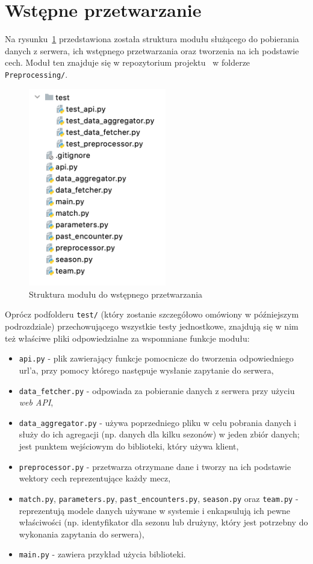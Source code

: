     \section{Wstępne przetwarzanie}
    \noindent Na rysunku~\ref{fig:preprocessing_structure} przedstawiona została struktura modułu służącego do pobierania danych z serwera, ich wstępnego przetwarzania oraz tworzenia na ich podstawie cech. Moduł ten znajduje się w repozytorium projektu~\cite{repo} w folderze \texttt{Preprocessing/}.
    \begin{figure}[H] 
        \centering\includegraphics[width=6cm]{figures/preprocessing_structure.png}
        \caption{Struktura modułu do wstępnego przetwarzania}
        \label{fig:preprocessing_structure}
    \end{figure}
    
    Oprócz podfolderu \texttt{test/} (który zostanie szczegółowo omówiony w późniejszym podrozdziale) przechowującego wszystkie testy jednostkowe, znajdują się w nim też właściwe pliki odpowiedzialne za wspomniane funkcje modułu:
    
    \begin{itemize}
        \item \texttt{api.py} - plik zawierający funkcje pomocnicze do tworzenia odpowiedniego url'a, przy pomocy którego następuje wysłanie zapytanie do serwera,
        \item \texttt{data\_fetcher.py} - odpowiada za pobieranie danych z serwera przy użyciu \emph{web API},
        \item \texttt{data\_aggregator.py} - używa poprzedniego pliku w celu pobrania danych i służy do ich agregacji (np. danych dla kilku sezonów) w jeden zbiór danych; jest punktem wejściowym do biblioteki, który używa klient,
        \item \texttt{preprocessor.py} - przetwarza otrzymane dane i tworzy na ich podstawie wektory cech reprezentujące każdy mecz,
        \item \texttt{match.py}, \texttt{parameters.py}, \texttt{past\_encounters.py}, \texttt{season.py} oraz \texttt{team.py} - reprezentują modele danych używane w systemie i enkapsulują ich pewne właściwości (np. identyfikator dla sezonu lub drużyny, który jest potrzebny do wykonania zapytania do serwera),
        \item \texttt{main.py} - zawiera przykład użycia biblioteki.
    \end{itemize}
    
